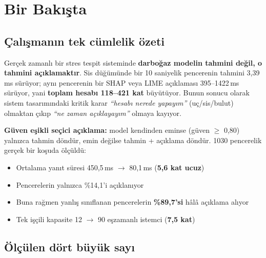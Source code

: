 \documentclass[11pt,a4paper]{report}
\newcommand{\ms}{\,ms}
\begin{document}
\chapter{Bir Bakışta}

\section{Çalışmanın tek cümlelik özeti}

\begin{bulgu}
Gerçek zamanlı bir stres tespit sisteminde \textbf{darboğaz modelin tahmini
değil, o tahmini açıklamaktır}. Sis düğümünde bir 10 saniyelik pencerenin
tahmini 3{,}39\ms{} sürüyor; aynı pencerenin bir SHAP veya LIME açıklaması
395--1422\ms{} sürüyor, yani \textbf{toplam hesabı 118--421 kat} büyütüyor.
Bunun sonucu olarak sistem tasarımındaki kritik karar \emph{``hesabı nerede
yapayım''} (uç/sis/bulut) olmaktan çıkıp \emph{``ne zaman açıklayayım''} olmaya
kayıyor.
\end{bulgu}

\begin{bulgu}
\textbf{Güven eşikli seçici açıklama:} model kendinden eminse (güven
$\geq$ 0{,}80) yalnızca tahmin döndür, emin değilse tahmin + açıklama döndür.
1030 pencerelik gerçek bir koşuda ölçüldü:
\begin{itemize}[nosep,leftmargin=1.4em]
  \item Ortalama yanıt süresi 450{,}5\ms{} $\rightarrow$ 80{,}1\ms{} (\textbf{5{,}6 kat ucuz})
  \item Pencerelerin yalnızca \%14{,}1'i açıklanıyor
  \item Buna rağmen yanlış sınıflanan pencerelerin \textbf{\%89{,}7'si} hâlâ açıklama alıyor
  \item Tek işçili kapasite 12 $\rightarrow$ 90 eşzamanlı istemci (\textbf{7{,}5 kat})
\end{itemize}
\end{bulgu}

\section{Ölçülen dört büyük sayı}
\end{document}
